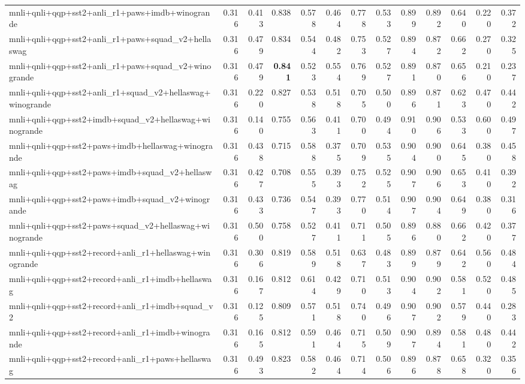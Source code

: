 \begin{table}[t]
\begin{tabular}{lrrrrrrrrrrrr}
    mnli+qnli+qqp+sst2+anli\_r1+paws+imdb+winogrande & 0.316 & 0.413 & 0.838 & 0.578 & 0.464 & 0.778 & 0.533 & 0.899 & 0.892 & 0.640 & 0.220 & 0.372 \\
    mnli+qnli+qqp+sst2+anli\_r1+paws+squad\_v2+hellaswag & 0.316 & 0.479 & 0.834 & 0.544 & 0.482 & 0.753 & 0.527 & 0.894 & 0.872 & 0.662 & 0.270 & 0.325 \\
    mnli+qnli+qqp+sst2+anli\_r1+paws+squad\_v2+winogrande & 0.316 & 0.479 & \textbf{0.841} & 0.523 & 0.554 & 0.769 & 0.527 & 0.891 & 0.870 & 0.656 & 0.210 & 0.237 \\
    mnli+qnli+qqp+sst2+anli\_r1+squad\_v2+hellaswag+winogrande & 0.316 & 0.220 & 0.827 & 0.538 & 0.518 & 0.705 & 0.500 & 0.896 & 0.871 & 0.623 & 0.470 & 0.442 \\
    mnli+qnli+qqp+sst2+imdb+squad\_v2+hellaswag+winogrande & 0.316 & 0.140 & 0.755 & 0.563 & 0.411 & 0.700 & 0.494 & 0.910 & 0.906 & 0.533 & 0.600 & 0.497 \\
    mnli+qnli+qqp+sst2+paws+imdb+hellaswag+winogrande & 0.316 & 0.438 & 0.715 & 0.588 & 0.375 & 0.709 & 0.535 & 0.904 & 0.900 & 0.645 & 0.380 & 0.458 \\
    mnli+qnli+qqp+sst2+paws+imdb+squad\_v2+hellaswag & 0.316 & 0.427 & 0.708 & 0.555 & 0.393 & 0.752 & 0.525 & 0.907 & 0.906 & 0.653 & 0.410 & 0.392 \\
    mnli+qnli+qqp+sst2+paws+imdb+squad\_v2+winogrande & 0.316 & 0.433 & 0.736 & 0.547 & 0.393 & 0.770 & 0.514 & 0.907 & 0.904 & 0.649 & 0.380 & 0.316 \\
    mnli+qnli+qqp+sst2+paws+squad\_v2+hellaswag+winogrande & 0.316 & 0.500 & 0.758 & 0.527 & 0.411 & 0.711 & 0.505 & 0.896 & 0.880 & 0.662 & 0.420 & 0.377 \\
    mnli+qnli+qqp+sst2+record+anli\_r1+hellaswag+winogrande & 0.316 & 0.306 & 0.819 & 0.589 & 0.518 & 0.637 & 0.483 & 0.899 & 0.879 & 0.642 & 0.560 & 0.484 \\
    mnli+qnli+qqp+sst2+record+anli\_r1+imdb+hellaswag & 0.316 & 0.167 & 0.812 & 0.614 & 0.429 & 0.710 & 0.513 & 0.904 & 0.902 & 0.581 & 0.520 & 0.485 \\
    mnli+qnli+qqp+sst2+record+anli\_r1+imdb+squad\_v2 & 0.316 & 0.125 & 0.809 & 0.571 & 0.518 & 0.740 & 0.496 & 0.907 & 0.902 & 0.579 & 0.440 & 0.283 \\
    mnli+qnli+qqp+sst2+record+anli\_r1+imdb+winogrande & 0.316 & 0.165 & 0.812 & 0.591 & 0.464 & 0.715 & 0.509 & 0.907 & 0.894 & 0.581 & 0.480 & 0.442 \\
    mnli+qnli+qqp+sst2+record+anli\_r1+paws+hellaswag & 0.316 & 0.493 & 0.823 & 0.582 & 0.464 & 0.714 & 0.506 & 0.896 & 0.878 & 0.658 & 0.320 & 0.356 \\

\end{tabular}
\end{table}
